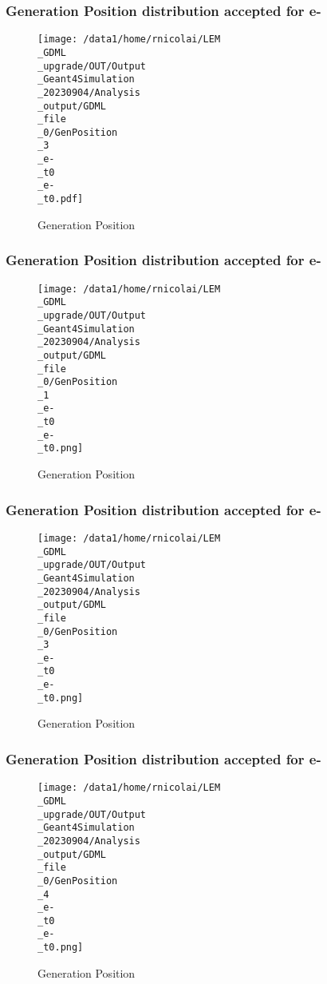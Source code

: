 \documentclass[8pt]{beamer}
\begin{document}
            \begin{frame}
                \frametitle{Generation Position distribution accepted for e-}
            
        \begin{figure}[h]
            \centering
            \texttt{[image: /data1/home/rnicolai/LEM\\\_GDML\\\_upgrade/OUT/Output\\\_Geant4Simulation\\\_20230904/Analysis\\\_output/GDML\\\_file\\\_0/GenPosition\\\_3\\\_e-\\\_t0\\\_e-\\\_t0.pdf]}
            \caption{Generation Position}
        \end{figure}
        
            \end{frame}
            
            \begin{frame}
                \frametitle{Generation Position distribution accepted for e-}
            
        \begin{figure}[h]
            \centering
            \texttt{[image: /data1/home/rnicolai/LEM\\\_GDML\\\_upgrade/OUT/Output\\\_Geant4Simulation\\\_20230904/Analysis\\\_output/GDML\\\_file\\\_0/GenPosition\\\_1\\\_e-\\\_t0\\\_e-\\\_t0.png]}
            \caption{Generation Position}
        \end{figure}
        
            \end{frame}
            
            \begin{frame}
                \frametitle{Generation Position distribution accepted for e-}
            
        \begin{figure}[h]
            \centering
            \texttt{[image: /data1/home/rnicolai/LEM\\\_GDML\\\_upgrade/OUT/Output\\\_Geant4Simulation\\\_20230904/Analysis\\\_output/GDML\\\_file\\\_0/GenPosition\\\_3\\\_e-\\\_t0\\\_e-\\\_t0.png]}
            \caption{Generation Position}
        \end{figure}
        
            \end{frame}
            
            \begin{frame}
                \frametitle{Generation Position distribution accepted for e-}
            
        \begin{figure}[h]
            \centering
            \texttt{[image: /data1/home/rnicolai/LEM\\\_GDML\\\_upgrade/OUT/Output\\\_Geant4Simulation\\\_20230904/Analysis\\\_output/GDML\\\_file\\\_0/GenPosition\\\_4\\\_e-\\\_t0\\\_e-\\\_t0.png]}
            \caption{Generation Position}
        \end{figure}
        
            \end{frame}
            
\end{document}
